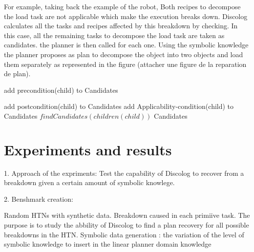 \documentclass[conference]{IEEEtran}
\begin{document}
	\par For example, taking back the example of the robot, Both recipes to decompose the load task are not applicable which make the execution breaks down. Discolog calculates all the tasks and recipes affected by this breakdown by checking. In this case, all the remaining tasks to decompose the load task are taken as candidates. the planner is then called for each one. Using the symbolic knowledge the planner proposes as plan to decompose the object into two objects and load them separately as represented in the figure (attacher une figure de la reparation de plan). 
		\label{findCandidates}
		\begin{algorithm}
	
		\begin{algorithmic}[]
						\State add precondition(child) to Candidates
						
						\State add postcondition(child) to Candidates
						\EndIf
						\State add Applicability-condition(child) to Candidates
						\EndIf
						\State $\textit{findCandidates} (children(child))$
						\EndFor
						\Return Candidates
		
						\EndProcedure 
		\end{algorithmic}
		\end{algorithm}
		
		\section{Experiments and results}
	
	
		1. Approach of the expriments: Test the capability of Discolog to recover from a breakdown given a certain amount of symbolic knowlege. 
	
	
		2. Benshmark creation:  
		
			Random HTNs with synthetic data. Breakdown caused in each primiive task. The purpose is to study the abbility of Discolog to find a plan recovery for all possible breakdowns in the HTN. 
			Symbolic data generation : the variation of the level of symbolic knowledge to insert in the linear planner domain knowledge
	
\end{document}
